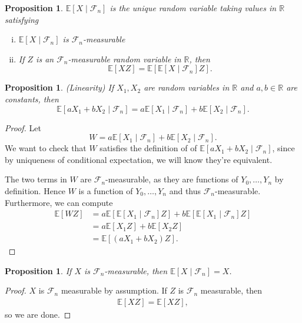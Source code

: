 \documentclass{tufte-handout}
\newcommand*\R{\mathbb{R}}
\newcommand*\E{\mathbb{E}}
\newtheorem{prop}[thm]{Proposition}
\theoremstyle{definition}
\begin{document}
\begin{prop}
	$\E\left[X \mid \mathscr{F}_n\right] $ is the unique random variable taking values in $\R$ satisfying 
	\begin{enumerate}[(i)]
		\item $\E\left[X \mid \mathscr{F}_n\right] $ is $\mathscr{F}_n$-measurable
		\item If $Z$ is an $\mathscr{F}_n$-measurable random variable in $\R$, then \[
			\E\left[XZ\right] = \E\left[\E\left[X \mid \mathscr{F}_n\right] Z\right] 
		.\] 
	\end{enumerate}
\end{prop}

\begin{prop}
	(Linearity) If $X_1,X_2$ are random variables in $\R$ and $a,b \in \R$ are constants, then \[
		\E\left[aX_1 + bX_2 \mid \mathscr{F}_n\right] = a\E\left[X_1 \mid \mathscr{F}_n\right] + b \E\left[X_2 \mid \mathscr{F}_n\right] 
	.\] 
\end{prop}

\begin{proof}
	Let \[W = a \E\left[X_1 \mid \mathscr{F}_n\right] + b \E\left[X_2 \mid \mathscr{F}_n\right]. \] We want to check that $W$ satisfies the definition of of $\E\left[aX_1 + bX_2 \mid \mathscr{F}_n\right] $, since by uniqueness of conditional expectation, we will know they're equivalent.

	The two terms in $W$ are $\mathscr{F}_n$-measurable, as they are functions of $Y_0,\ldots,Y_n$ by definition. Hence $W$ is a function of $Y_0,\ldots,Y_n$ and thus $\mathscr{F}_n$-measurable.
	Furthermore, we can compute
	\begin{align*}
		\E\left[WZ\right]  &= a\E\left[\E\left[X_1 \mid \mathscr{F}_n\right] Z\right] + b\E\left[\E\left[X_1 \mid \mathscr{F}_n\right] Z\right] \\
		&= a \E\left[X_1Z\right] + b\E\left[X_2Z\right]  \\
		&= \E\left[\left( aX_1 + bX_2 \right)Z\right] 
	.\end{align*}
\end{proof}

\begin{prop}
	If $X$ is $\mathscr{F}_n$-measurable, then $\E\left[X \mid \mathscr{F}_n\right] = X$.
\end{prop}

\begin{proof}
	$X$ is $\mathscr{F}_n$ measurable by assumption. If $Z$ is $\mathscr{F}_n$ measurable, then
	\begin{align*}
		\E\left[XZ\right] = \E\left[XZ\right] ,
	\end{align*} so we are done.
\end{proof}
\end{document}

